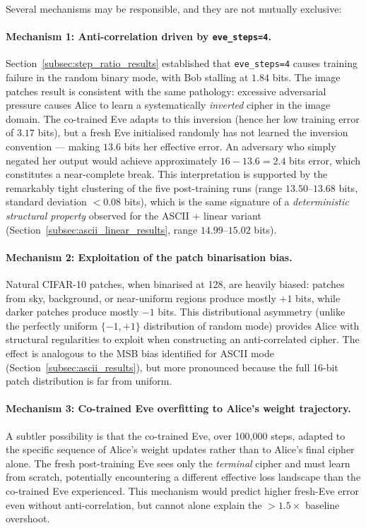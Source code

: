 \documentclass[12pt, a4paper]{article}
\newcommand{\code}[1]{\texttt{\color{CodeRed}#1}}
\begin{document}
Several mechanisms may be responsible, and they are not mutually exclusive:

\paragraph{Mechanism 1: Anti-correlation driven by \texttt{eve\_steps=4}.}
Section~\ref{subsec:step_ratio_results} established that \code{eve\_steps=4}
causes training failure in the random binary mode, with Bob stalling at
$1.84$ bits. The image patches result is consistent with the same
pathology: excessive adversarial pressure causes Alice to learn a systematically
\emph{inverted} cipher in the image domain. The co-trained Eve adapts to this
inversion (hence her low training error of $3.17$ bits), but a fresh Eve
initialised randomly has not learned the inversion convention --- making
$13.6$ bits her effective error. An adversary who simply negated her output
would achieve approximately $16 - 13.6 = 2.4$ bits error, which constitutes
a near-complete break. This interpretation is supported by the remarkably
tight clustering of the five post-training runs (range $13.50$--$13.68$ bits,
standard deviation $< 0.08$ bits), which is the same signature of
a \emph{deterministic structural property} observed for the ASCII + linear
variant (Section~\ref{subsec:ascii_linear_results}, range $14.99$--$15.02$ bits).

\paragraph{Mechanism 2: Exploitation of the patch binarisation bias.}
Natural CIFAR-10 patches, when binarised at 128, are heavily biased:
patches from sky, background, or near-uniform regions produce mostly
$+1$ bits, while darker patches produce mostly $-1$ bits. This
distributional asymmetry (unlike the perfectly uniform $\{-1,+1\}$
distribution of random mode) provides Alice with structural regularities
to exploit when constructing an anti-correlated cipher. The effect is
analogous to the MSB bias identified for ASCII mode
(Section~\ref{subsec:ascii_results}), but more pronounced because the
full 16-bit patch distribution is far from uniform.

\paragraph{Mechanism 3: Co-trained Eve overfitting to Alice's weight trajectory.}
A subtler possibility is that the co-trained Eve, over 100{,}000 steps, adapted
to the specific sequence of Alice's weight updates rather than to Alice's final
cipher alone. The fresh post-training Eve sees only the \emph{terminal} cipher
and must learn from scratch, potentially encountering a different effective
loss landscape than the co-trained Eve experienced. This mechanism would
predict higher fresh-Eve error even without anti-correlation, but cannot alone
explain the $>1.5\times$ baseline overshoot.
\end{document}
